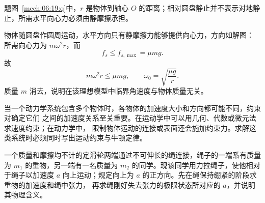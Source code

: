 {\begin{origexamplebox}{}
\begin{qualityfigure}
\label{mech:06:19:q}
\end{qualityfigure}
\end{origexamplebox}

\begin{xesolution}题图~\ref{mech:06:19:q}中，$r$ 是物体到轴心 $O$ 的距离；相对圆盘静止并不表示对地静止，所需水平向心力必须由静摩擦承担。

物体随圆盘作圆周运动，水平方向只有静摩擦力能够提供向心力，方向如解图：
\soldiagTwoNineteen
所需向心力为 $m\omega^2r$，而
\[
 f_s\le f_{s,\max}=\mu mg.
\]
故
\[
 m\omega^2r\le\mu mg,
 \qquad
 \boxed{\omega_0=\sqrt{\frac{\mu g}{r}}}.
\]
质量 $m$ 消去，说明在该理想模型中临界角速度与物体质量无关。
\end{xesolution}

当一个动力学系统包含多个物体时，各物体的加速度大小和方向都可能不同，约束对确定它们
之间的加速度关系至关重要。在运动学中可以用几何、代数或微元法求速度约束；在动力学中，
限制物体运动的连接或表面还会施加约束力。求解这类系统时必须同时写出运动约束与牛顿定律。

\begin{origexamplebox}{}\label{ch06:ex:s05-2-20}
一个质量和摩擦均不计的定滑轮两端通过不可伸长的绳连接，绳子的一端系有质量为 $m_1$
的重物，另一端有一名质量为 $m_2$ 的同学。现该同学用力拉绳子，使他相对于绳子以加速度
$a$ 向上运动；规定向上为 $a$ 的正方向。先在绳保持绷紧的阶段求重物的加速度和绳中张力，
再求绳刚好失去张力的极限状态所对应的 $a$，并说明其物理含义。

\begin{qualityfigure}
\label{mech:06:20:q}
\end{qualityfigure}
\end{origexamplebox}

}
